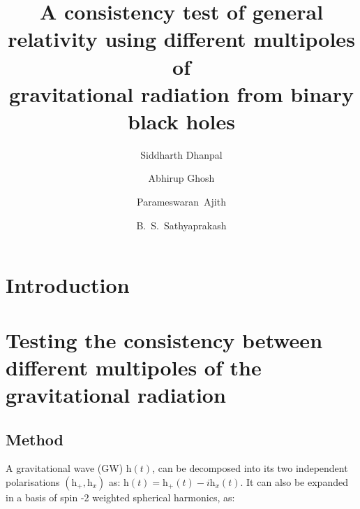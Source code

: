 \documentclass[prd,preprintnumbers,twocolumn,eqsecnum,floatfix,a4paper,nofootinbib,superscriptaddress]{revtex4}
\begin{document}
\newcommand{\be}{\begin{equation}}
\newcommand{\ee}{\end{equation}}
\newcommand{\ber}{\begin{eqnarray}}
\newcommand{\eer}{\end{eqnarray}}
\def\bea{\begin{eqnarray}}
\def\eea{\end{eqnarray}}
\newcommand{\etal}{\emph{et al}}

\title{A consistency test of general relativity using different multipoles of \\gravitational radiation from binary black holes}
\author{Siddharth Dhanpal}
\author{Abhirup Ghosh}
\author{Parameswaran~Ajith}
\author{B.~S.~Sathyaprakash}

\begin{abstract}
\end{abstract}
\maketitle
\section{Introduction}
\section{Testing the consistency between different multipoles of the gravitational radiation}
\subsection{Method}\label{ssec:Method}
A gravitational wave (GW) $\mathrm{h}(t)$, can be decomposed into its two independent polarisations $(\mathrm{h} _+,\mathrm{h} _x)$ as: $\mathrm{h}(t) = \mathrm{h} _+(t) - i \mathrm{h} _x(t)$. It can also be expanded in a basis of spin -2 weighted spherical harmonics, as:
\end{document}
